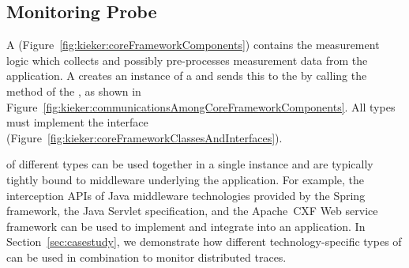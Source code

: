 \subsection{Monitoring Probe}\label{sec:monitoringProbe}
% 
% 
\noindent A \MonitoringProbe{} (Figure~\ref{fig:kieker:coreFrameworkComponents}) contains the measurement logic which collects and possibly %
pre-processes measurement data from the application. %
A \MonitoringProbe{} creates an instance of a \MonitoringRecord{} and sends this %
\MonitoringRecord{} to the \TpmonController{} by calling the
method  of the \TpmonController{}, as shown in %
Figure~\ref{fig:kieker:communicationsAmongCoreFrameworkComponents}. %
All \MonitoringProbe{} types must implement the interface  (Figure~\ref{fig:kieker:coreFrameworkClassesAndInterfaces}). %

\MonitoringProbes{} of different types can be used together in a single \KiekerTpmon{} %
instance and are typically tightly bound to middleware underlying the application. %
For example, the interception APIs of Java middleware technologies provided by the
Spring framework, the Java Servlet specification, and the Apache~CXF Web service
framework can be used to implement and integrate \MonitoringProbes{} into an application. %
In Section~\ref{sec:casestudy}, we demonstrate how different technology-specific
types of \MonitoringProbes{} can be used in combination to monitor distributed traces.

